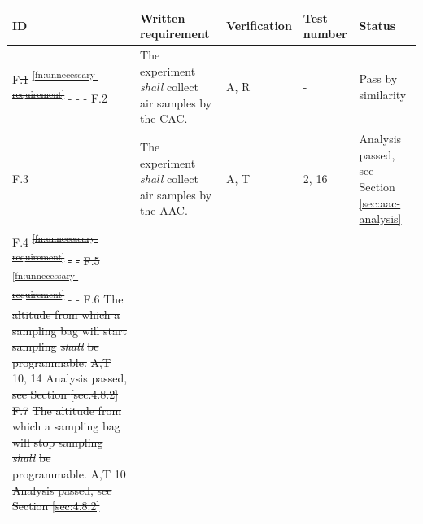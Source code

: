 \documentclass[a4paper,12pt,twoside]{article}
\providecommand{\DIFdeltex}[1]{{\protect\color{red}\sout{#1}}}                      %
\providecommand{\DIFdelbegin}{} %
\providecommand{\DIFdelend}{} %
\providecommand{\DIFdel}[1]{\texorpdfstring{\DIFdeltex{#1}}{}} %
\newcommand{\DIFscaledelfig}{0.5}
\newlength{\DIFdelgraphicswidth} %
\newlength{\DIFdelgraphicsheight} %
\newcommand{\DIFdelincludegraphics}[2][]{%
\sbox{\DIFdelgraphicsbox}{\DIFOincludegraphics[#1]{#2}}%
\settoboxwidth{\DIFdelgraphicswidth}{\DIFdelgraphicsbox} %
\settoboxtotalheight{\DIFdelgraphicsheight}{\DIFdelgraphicsbox} %
\scalebox{\DIFscaledelfig}{%
\parbox[b]{\DIFdelgraphicswidth}{\usebox{\DIFdelgraphicsbox}\\[-\baselineskip] \rule{\DIFdelgraphicswidth}{0em}}\llap{\resizebox{\DIFdelgraphicswidth}{\DIFdelgraphicsheight}{%
\setlength{\unitlength}{\DIFdelgraphicswidth}%
\begin{picture}(1,1)%
\thicklines\linethickness{2pt} %
{\color[rgb]{1,0,0}\put(0,0){\framebox(1,1){}}}%
{\color[rgb]{1,0,0}\put(0,0){\line( 1,1){1}}}%
{\color[rgb]{1,0,0}\put(0,1){\line(1,-1){1}}}%
\end{picture}%
}\hspace*{3pt}}} %
} %
\DeclareRobustCommand{\DIFdelbegin}{\DIFOdelbegin \let\includegraphics\DIFdelincludegraphics} %
\DeclareRobustCommand{\DIFdelend}{\DIFOaddend \let\includegraphics\DIFOincludegraphics} %
\begin{document}
\begin{longtable}[]{|m{}| m{} |m{} |m{}|m{}|}

\hline
\textbf{ID}   & \textbf{Written requirement}                                                                                                                                                     & \textbf{Verification} & \textbf{Test number} & \textbf{Status} \\ \hline
F\DIFdelbegin \DIFdel{.1  }%
\DIFdel{\textsuperscript{\ref{fn:unnecessary-requirement}}     }%
\DIFdel{- }%
\DIFdel{- }%
\DIFdel{- }%
\DIFdel{F}\DIFdelend .2  & The experiment \textit{shall} collect air samples by the CAC.&  A, R & - & Pass by similarity \cite{AircoreFlights} \\ \hline
F.3  & The experiment \textit{shall} collect air samples by the AAC. & A, T& 2, 16 & Analysis passed, see Section \ref{sec:aac-analysis}\\ \hline
F\DIFdelbegin \DIFdel{.4  }%
\DIFdel{\textsuperscript{\ref{fn:unnecessary-requirement}} }%
\DIFdel{- }%
\DIFdel{-}%
\DIFdel{F.5  }%
\DIFdel{\textsuperscript{\ref{fn:unnecessary-requirement}} }%
\DIFdel{- }%
\DIFdel{- }%
\DIFdel{F.6  }%
\DIFdel{The altitude from which a sampling bag will start sampling }\textit{\DIFdel{shall}} %
\DIFdel{be programmable. }%
\DIFdel{A,T}%
\DIFdel{10, 14  }%
\DIFdel{Analysis passed, see Section \ref{sec:4.8.2}}%
\DIFdel{F.7  }%
\DIFdel{The altitude from which a sampling bag will stop sampling }\textit{\DIFdel{shall}} %
\DIFdel{be programmable.}%
\DIFdel{A,T }%
\DIFdel{10  }%
\DIFdel{Analysis passed, see Section \ref{sec:4.8.2}}%

\end{longtable}
\end{document}

